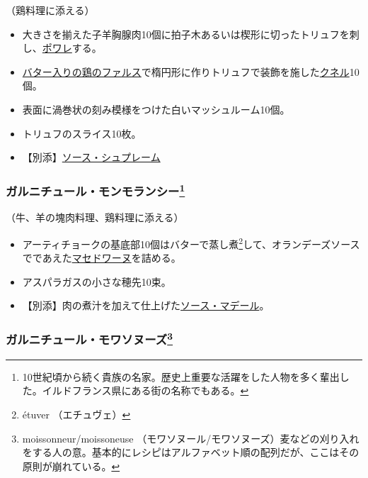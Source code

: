 \begin{recette}
（鶏料理に添える）

\begin{itemize}
\item
  大きさを揃えた子羊胸腺肉10個に拍子木あるいは楔形に切ったトリュフを刺し、\protect\hyperlink{les-poeles}{ポワレ}する。
\item
  \protect\hyperlink{farce-b}{バター入りの鶏のファルス}で楕円形に作りトリュフで装飾を施した\protect\hyperlink{quenelles}{クネル}10個。
\item
  表面に渦巻状の刻み模様をつけた白いマッシュルーム10個。
\item
  トリュフのスライス10枚。
\item
  【別添】\protect\hyperlink{sauce-supreme}{ソース・シュプレーム}
\end{itemize}

\atoaki{}

\hypertarget{garniture-a-la-montmorency}{%
\subsubsection[ガルニチュール・モンモランシー]{\texorpdfstring{ガルニチュール・モンモランシー\footnote{10世紀頃から続く貴族の名家。歴史上重要な活躍をした人物を多く輩出した。イルドフランス県にある街の名称でもある。}}{ガルニチュール・モンモランシー}}\label{garniture-a-la-montmorency}}



（牛、羊の塊肉料理、鶏料理に添える）

\begin{itemize}
\item
  アーティチョークの基底部10個はバターで蒸し煮\footnote{étuver
    （エチュヴェ）}して、オランデーズソースでであえた\protect\hyperlink{garniture-macedoine}{マセドワーヌ}を詰める。
\item
  アスパラガスの小さな穂先10束。
\item
  【別添】肉の煮汁を加えて仕上げた\protect\hyperlink{sauce-madere}{ソース・マデール}。
\end{itemize}

\atoaki{}

\hypertarget{garniture-a-la-moissonneuse}{%
\subsubsection[ガルニチュール・モワソヌーズ]{\texorpdfstring{ガルニチュール・モワソヌーズ\footnote{moissonneur/moissoneuse
  （モワソヌール/モワソヌーズ）麦などの刈り入れをする人の意。基本的にレシピはアルファベット順の配列だが、ここはその原則が崩れている。}}{ガルニチュール・モワソヌーズ}}\label{garniture-a-la-moissonneuse}}


\end{recette}
